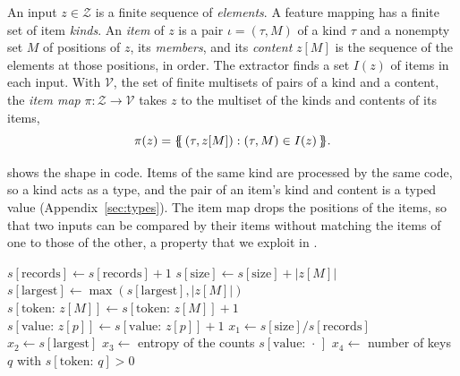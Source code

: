 \label{def:fw:item}
{
An input $z \in \mathcal{Z}$ is a finite sequence of \emph{elements}. A feature mapping has a finite set of item
\emph{kinds}. An \emph{item} of $z$ is a pair $\iota = (\tau, M)$ of a kind $\tau$ and a nonempty set $M$ of
positions of $z$, its \emph{members}, and its \emph{content} $z[M]$ is the sequence of the elements at those
positions, in order. The extractor finds a set $I(z)$ of items in each input. With $\mathcal{V}$, the set of finite
multisets of pairs of a kind and a content, the \emph{item map} $\pi: \mathcal{Z} \to \mathcal{V}$ takes $z$ to the
multiset of the kinds and contents of its items,
\begin{equation}
  \label{eq:fw:items}
  \pi(z) = \{\!\!\{\, (\tau, z[M]) : (\tau, M) \in I(z) \,\}\!\!\}.
\end{equation}
}

\noindent {} shows the shape in code. Items of the same kind are processed by the same code, so a kind acts as a
type, and the pair of an item's kind and content is a typed value (Appendix~\ref{sec:types}). The item map drops the
positions of the items, so that two inputs can be compared by their items without matching the items of one to those
of the other, a property that we exploit in .

\begin{algorithm}[t]
  \caption{A sum-then-readout extractor. Each loop finds the items of one kind, the body of the loop adds an item's
  contribution to the sums, and the last lines are readouts. Every sum starts at its neutral element.}
  \label{alg:fw:extractor}
  \begin{algorithmic}[1]
     
      \State $s[\mathrm{records}] \gets s[\mathrm{records}] + 1$
      \State $s[\mathrm{size}] \gets s[\mathrm{size}] + |z[M]|$
      \State $s[\mathrm{largest}] \gets \max(s[\mathrm{largest}], |z[M]|)$
    \EndFor
     
      \State $s[\mathrm{token}{:}\, z[M]] \gets s[\mathrm{token}{:}\, z[M]] + 1$ 
    \EndFor
     
      \State $s[\mathrm{value}{:}\, z[p]] \gets s[\mathrm{value}{:}\, z[p]] + 1$
    \EndFor
    \State $x_1 \gets s[\mathrm{size}] / s[\mathrm{records}]$ 
    \State $x_2 \gets s[\mathrm{largest}]$
    \State $x_3 \gets$ entropy of the counts $s[\mathrm{value}{:}\, \cdot\,]$
    \State $x_4 \gets$ number of keys $q$ with $s[\mathrm{token}{:}\, q] > 0$
  \end{algorithmic}
\end{algorithm}

